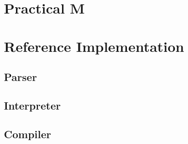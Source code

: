 \documentclass{article}
\begin{document}
    \section{Practical M}\label{sec:practical}

    \section{Reference Implementation}\label{sec:implementation}

    \subsection{Parser}\label{subsec:parser}

    

    \subsection{Interpreter}\label{subsec:interpreter}

    

    \subsection{Compiler}\label{subsec:compiler}

    
\end{document}
